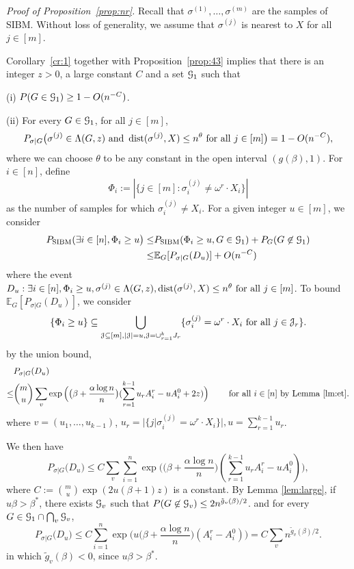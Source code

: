 \documentclass{article}
\begin{document}
\noindent
{\em Proof of Proposition~\ref{prop:nr}.}
Recall that $\sigma^{(1)},\dots,\sigma^{(m)}$ are the samples of SIBM.
Without loss of generality, we assume that 
$\sigma^{(j)}$ is nearest to $X$ for all $j\in[m]$. 

Corollary~\ref{cr:1} together with Proposition~\ref{prop:43} implies that there is an integer $z>0$,
a large constant $C$ and a set $\mathcal{G}_{1}$ such that

\noindent (i)
$P(G\in\mathcal{G}_{1}) \ge 1- O(n^{-C})$.

\noindent (ii) For every $G\in\mathcal{G}_{1}$, for all $j\in[m]$,
\begin{equation}  \label{eq:chui}
P_{\sigma|G} \big( \sigma^{(j)}\in  \Lambda(G, z)
\text{~and~} \operatorname{dist}(\sigma^{(j)}, X) \le n^\theta
\text{~for all~} j\in[m]  \big)
=1- O(n^{-C}) ,
\end{equation}
where we can choose $\theta$ to be any constant in the open interval $(g(\beta), 1)$.
For $i\in[n]$, define 
$$
\Phi_i := |\{j\in[m]: \sigma_i^{(j)} \neq \omega^r \cdot X_i\}|
$$
as the number of samples for which $\sigma_i^{(j)} \neq X_i$.
For a given integer $u\in[m]$, we consider
\begin{align*}
P_{\operatorname{SIBM}}( \exists i \in [n], \Phi_i \ge u \big) \leq &P_{\operatorname{SIBM}}( \Phi_i \ge u , G \in \mathcal{G}_{1}) + P_G(G \not\in \mathcal{G}_{1}) \\
\leq & \mathbb{E}_G[P_{\sigma |G}(D_u)]+ O(n^{-C})
\end{align*}
where the event $D_u: \exists i \in [n], \Phi_i \ge u, \sigma^{(j)}\in \Lambda(G,z) ,\operatorname{dist}(\sigma^{(j)}, X) \le n^{\theta} \text{~for all~} j\in[m]$.
To bound  $\mathbb{E}_G[P_{\sigma |G}(D_u)]$,
we consider
$$
\{\Phi_i \ge u\} \subseteq
\bigcup_{\mathcal{J}\subseteq[m], |\mathcal{J}|=u, \mathcal{J}=\cup_{r=1}^k J_r} 
\{\sigma_i^{(j)} = \omega^r \cdot X_i \text{~for all~} j\in \mathcal{J}_r\} .
$$
by the union bound,
\begin{align*}
& P_{\sigma|G}(D_u) \\
\le &  \binom{m}{u}\sum_v \exp\Big(\big(\beta+\frac{\alpha\log n}{n} \big) (\sum_{r=1}^{k-1} u_r A^r_i- u A^0_i + 2z) \Big)
\quad\quad\text{~for all~} i\in[n] \textrm{ by Lemma~\ref{lm:et}}.
\end{align*}
where  $v=(u_1, \dots, u_{k-1})$, $u_r = |\{j | \sigma_i^{(j)} = \omega^r \cdot X_i \}|, u=\sum_{r=1}^{k-1} u_r$.

We then have
$$
P_{\sigma|G} \big(D_u\big) \le 
C  \sum_{v}\sum_{i=1}^n \exp\Big(\big(\beta+\frac{\alpha\log n}{n} \big) (\sum_{r=1}^{k-1} u_r A^r_i- u A^0_i ) \Big),
$$
where $C:=\binom{m}{u}\exp(2u (\beta + 1) z)$ is a constant.
By Lemma \ref{lem:large}, if $u\beta>\beta^*$, there exists $\mathcal{G}_v$ such that $P(G\not\in\mathcal{G}_v) \leq 2n^{\tilde{g}_v(\beta)/2}$.
and for every $G\in\mathcal{G}_1 \cap \bigcap_{v}\mathcal{G}_{v}$,
$$
P_{\sigma|G} \big(D_u\big) \le 
C\sum_{i=1}^n \exp\Big(u \big(\beta+\frac{\alpha\log n}{n} \big) (A^r_i-A^0_i ) \Big) = C\sum_{v} n^{\tilde{g}_v(\beta)/2}.
$$
in which $\tilde{g}_v(\beta) < 0$, since $u\beta > \beta^*$.
\end{document}
